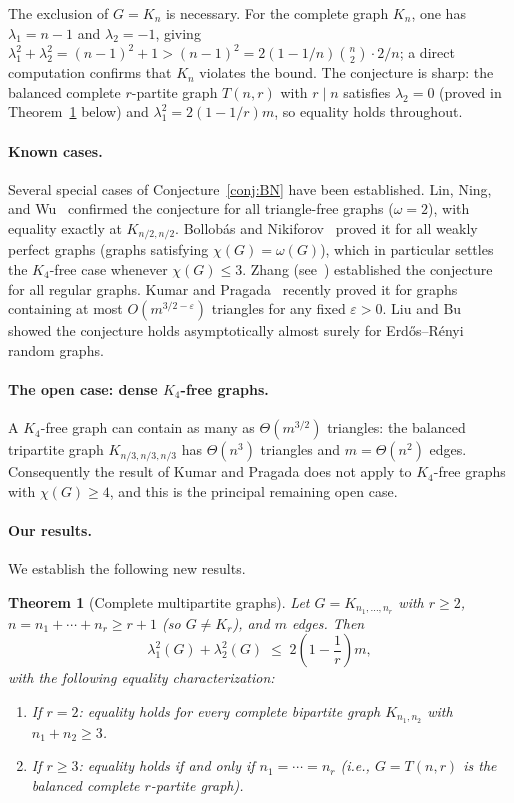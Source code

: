 \documentclass[preprint,12pt]{elsarticle}
\theoremstyle{plain}
\newtheorem{theorem}{Theorem}[section]
\theoremstyle{definition}
\begin{document}
The exclusion of $G = K_n$ is necessary.  For the complete graph $K_n$,
one has $\lambda_1 = n-1$ and $\lambda_2 = -1$, giving
$\lambda_1^2 + \lambda_2^2 = (n-1)^2 + 1 > (n-1)^2 = 2(1-1/n)\binom{n}{2}\cdot 2/n$;
a direct computation confirms that $K_n$ violates the bound.
The conjecture is sharp: the balanced complete $r$-partite graph
$T(n,r)$ with $r \mid n$ satisfies $\lambda_2 = 0$
(proved in Theorem~\ref{thm:multipartite} below) and
$\lambda_1^2 = 2(1-1/r)m$, so equality holds throughout.

\paragraph{Known cases.}
Several special cases of Conjecture~\ref{conj:BN} have been established.
Lin, Ning, and Wu~\cite{LinNingWu2021} confirmed the conjecture for all
triangle-free graphs ($\omega = 2$), with equality exactly at $K_{n/2,n/2}$.
Bollob\'as and Nikiforov~\cite{BollobasNikiforov2007} proved it for all
weakly perfect graphs (graphs satisfying $\chi(G) = \omega(G)$), which
in particular settles the $K_4$-free case whenever $\chi(G) \leq 3$.
Zhang (see~\cite{ElphickWocjan2014}) established the conjecture for
all regular graphs.
Kumar and Pragada~\cite{KumarPragada2024} recently proved it for graphs
containing at most $O(m^{3/2-\varepsilon})$ triangles for any fixed
$\varepsilon > 0$.
Liu and Bu~\cite{LiuBu2025} showed the conjecture holds asymptotically
almost surely for Erd\H{o}s--R\'enyi random graphs.

\paragraph{The open case: dense $K_4$-free graphs.}
A $K_4$-free graph can contain as many as $\Theta(m^{3/2})$ triangles:
the balanced tripartite graph $K_{n/3,n/3,n/3}$ has $\Theta(n^3)$
triangles and $m = \Theta(n^2)$ edges.
Consequently the result of Kumar and Pragada does not apply to $K_4$-free
graphs with $\chi(G) \geq 4$, and this is the principal remaining open case.

\paragraph{Our results.}
We establish the following new results.

\begin{theorem}[Complete multipartite graphs]
  \label{thm:multipartite}
  Let $G = K_{n_1,\ldots,n_r}$ with $r \geq 2$,
  $n = n_1 + \cdots + n_r \geq r+1$ (so $G \neq K_r$), and $m$ edges.
  Then
  \[
    \lambda_1^2(G) + \lambda_2^2(G)
    \;\leq\;
    2\!\left(1 - \frac{1}{r}\right)m,
  \]
  with the following equality characterization:
  \begin{enumerate}[label=(\alph*)]
    \item If $r = 2$: equality holds for \emph{every} complete bipartite graph
          $K_{n_1,n_2}$ with $n_1 + n_2 \geq 3$.
    \item If $r \geq 3$: equality holds if and only if $n_1 = \cdots = n_r$
          (i.e., $G = T(n,r)$ is the balanced complete $r$-partite graph).
  \end{enumerate}
\end{theorem}
\end{document}
